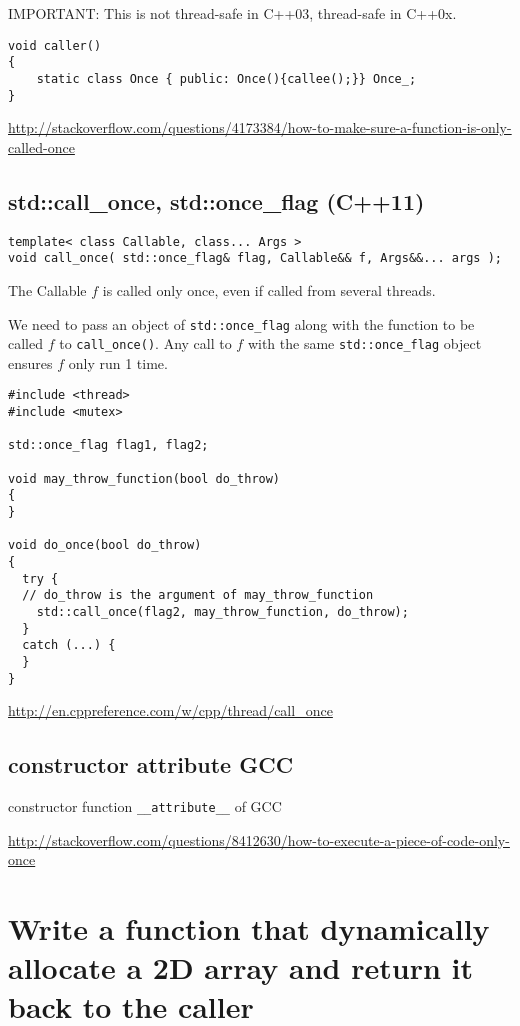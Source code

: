 IMPORTANT: This is not thread-safe in C++03, thread-safe in C++0x. 

\begin{verbatim}
void caller()
{
    static class Once { public: Once(){callee();}} Once_;
}
\end{verbatim}
\url{http://stackoverflow.com/questions/4173384/how-to-make-sure-a-function-is-only-called-once}

\subsection{std::call\_once, std::once\_flag (C++11)}
\label{sec:std::call_once-C++11}


\begin{verbatim}
template< class Callable, class... Args >
void call_once( std::once_flag& flag, Callable&& f, Args&&... args );
\end{verbatim}
The Callable $f$ is called only once, even if called from several threads.

We need to pass an object of \verb!std::once_flag! along with the function to be
called $f$ to \verb!call_once()!. Any call to $f$ with the same
\verb!std::once_flag! object ensures $f$ only run 1 time.

\begin{lstlisting}
#include <thread>
#include <mutex>

std::once_flag flag1, flag2;

void may_throw_function(bool do_throw)
{
}

void do_once(bool do_throw)
{
  try {
  // do_throw is the argument of may_throw_function
    std::call_once(flag2, may_throw_function, do_throw);
  }
  catch (...) {
  }
}

\end{lstlisting}
\url{http://en.cppreference.com/w/cpp/thread/call_once}

\subsection{constructor attribute GCC}

constructor function \verb!__attribute__! of GCC

\url{http://stackoverflow.com/questions/8412630/how-to-execute-a-piece-of-code-only-once}

\section{Write a function that dynamically allocate a 2D array and return it
back to the caller}


